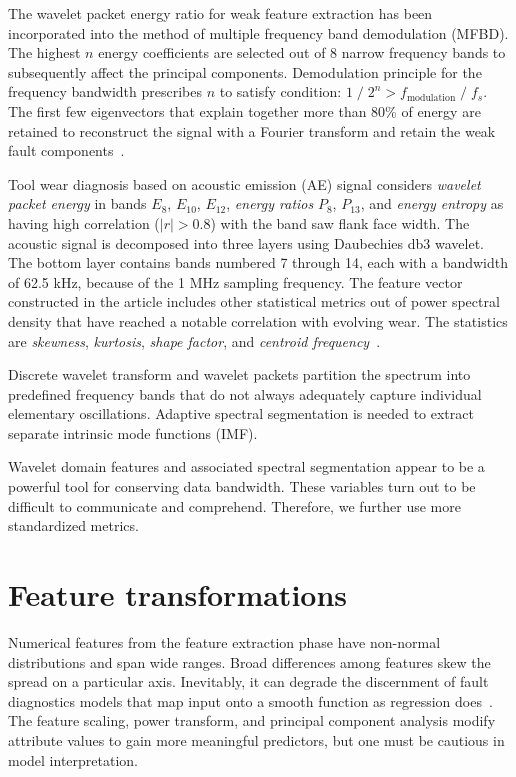 The wavelet packet energy ratio for weak feature extraction has been incorporated into the method of multiple frequency band demodulation (MFBD). The highest $n$ energy coefficients are selected out of 8 narrow frequency bands to subsequently affect the principal components. Demodulation principle for the frequency bandwidth prescribes $n$ to satisfy condition: $1\;/\;2^n > f_{\mathrm{modulation}}\;/\;f_s$. The first few eigenvectors that explain together more than 80\% of energy are retained to reconstruct the signal with a Fourier transform and retain the weak fault components~\cite{song_mfbd_2021}.

Tool wear diagnosis based on acoustic emission (AE) signal considers \emph{wavelet packet energy} in bands $E_{8}$, $E_{10}$, $E_{12}$, \emph{energy ratios} $P_{8}$, $P_{13}$, and \emph{energy entropy} as having high correlation ($|r| > 0.8$) with the band saw flank face width. The acoustic signal is decomposed into three layers using Daubechies db3 wavelet. The bottom layer contains bands numbered 7 through 14, each with a bandwidth of 62.5 kHz, because of the 1 MHz sampling frequency. The feature vector constructed in the article includes other statistical metrics out of power spectral density that have reached a notable correlation with evolving wear. The statistics are \emph{skewness}, \emph{kurtosis}, \emph{shape factor}, and \emph{centroid frequency}~\cite{zhuo_research_2022}.

Discrete wavelet transform and wavelet packets partition the spectrum into predefined frequency bands that do not always adequately capture individual elementary oscillations. Adaptive spectral segmentation is needed to extract separate intrinsic mode functions (IMF).

Wavelet domain features and associated spectral segmentation appear to be a powerful tool for conserving data bandwidth. These variables turn out to be difficult to communicate and comprehend. Therefore, we further use more standardized metrics.

\section{Feature transformations} \label{section:feature-selection}
Numerical features from the feature extraction phase have non-normal distributions and span wide ranges. Broad differences among features skew the spread on a particular axis. Inevitably, it can degrade the discernment of fault diagnostics models that map input onto a smooth function as regression does~\cite{zheng_feature_2018}. The feature scaling, power transform, and principal component analysis modify attribute values to gain more meaningful predictors, but one must be cautious in model interpretation.

